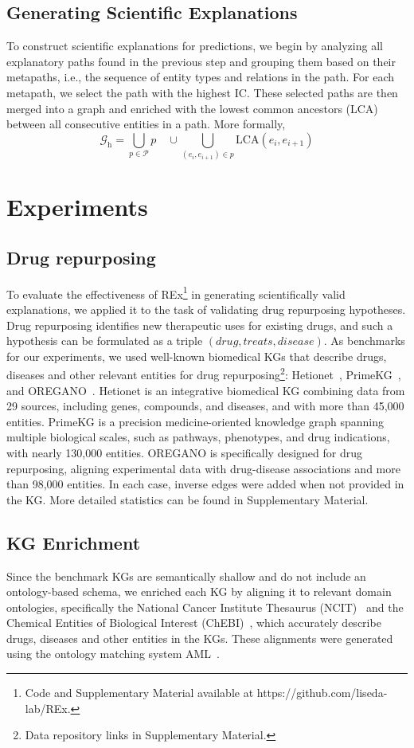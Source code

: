 \documentclass{article}
\theoremstyle{definition}
\begin{document}
\subsection{Generating Scientific Explanations}
To construct scientific explanations for predictions, we begin by analyzing all explanatory paths found in the previous step and grouping them based on their metapaths, i.e., the sequence of entity types and relations in the path. For each metapath, we select the path with the highest IC. These selected paths are then merged into a graph and enriched with the lowest common ancestors (LCA) between all consecutive entities in a path. More formally,
\[\mathcal{G}_\text{h} = \bigcup_{p \in \mathcal{P}} p  \quad \cup \bigcup_{(e_i, e_{i+1}) \in p} \text{LCA}(e_i, e_{i+1})
\]


\section{Experiments}
\subsection{Drug repurposing}
To evaluate the effectiveness of REx\footnote{Code and Supplementary Material available at https://github.com/liseda-lab/REx.} in generating scientifically valid explanations, we applied it to the task of validating drug repurposing hypotheses. Drug repurposing identifies new therapeutic uses for existing drugs, and such a hypothesis can be formulated as a triple $(drug, treats, disease)$. As benchmarks for our experiments, we used well-known biomedical KGs that describe drugs, diseases and other relevant entities for drug repurposing\footnote{Data repository links in Supplementary Material.}: Hetionet~\cite{himmelstein2017systematic}, PrimeKG~\cite{chandak2023building}, and OREGANO~\cite{boudin2023oregano}. Hetionet is an integrative biomedical KG combining data from 29 sources, including genes, compounds, and diseases, and with more than 45,000 entities. PrimeKG is a precision medicine-oriented knowledge graph spanning multiple biological scales, such as pathways, phenotypes, and drug indications, with nearly 130,000 entities. OREGANO is specifically designed for drug repurposing, aligning experimental data with drug-disease associations and more than 98,000 entities. In each case, inverse edges were added when not provided in the KG. More detailed statistics can be found in Supplementary Material. 

\subsection{KG Enrichment}
Since the benchmark KGs are semantically shallow and do not include an ontology-based schema, we enriched each KG by aligning it to relevant domain ontologies, specifically the National Cancer Institute Thesaurus (NCIT)~\cite{hartel2005modeling} and the Chemical Entities of Biological Interest (ChEBI)~\cite{degtyarenko2007chebi}, which accurately describe drugs, diseases and other entities in the KGs. These alignments were generated using the ontology matching system AML~\cite{faria2023agreementmakerlight}.
\end{document}
